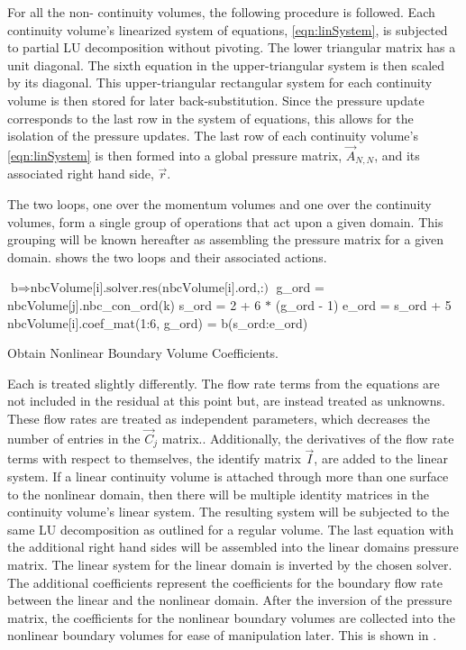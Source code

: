 For all the non- continuity volumes, the following procedure is followed.
Each continuity volume's linearized system of equations, \eqref{eqn:linSystem}, is subjected to partial LU decomposition without pivoting.
The lower triangular matrix has a unit diagonal.
The sixth equation in the upper-triangular system is then scaled by its diagonal.
This upper-triangular rectangular system for each continuity volume is then stored for later back-substitution.
Since the pressure update corresponds to the last row in the system of equations, this allows for the isolation of the pressure updates.
The last row of each continuity volume's \eqref{eqn:linSystem} is then formed into a global pressure matrix, $\vec{A}_{N,N}$, and its associated right hand side, $\vec{r}$.

The two loops, one over the momentum volumes and one over the continuity volumes, form a single group of operations that act upon a given domain.
This grouping will be known hereafter as assembling the pressure matrix for a given domain.
 shows the two loops and their associated actions.

\begin{algo}[ht!]
\setlength{\baselineskip}{0.625\baselineskip}
\begin{algorithmic}[1]
	\Set $\text{b} \Rightarrow \text{nbcVolume[i].solver.res(nbcVolume[i].ord,:)}$
			\Set g\_ord = nbcVolume[j].nbc\_con\_ord(k)
			\Set s\_ord = 2 + 6 $*$ (g\_ord - 1)
			\Set e\_ord = s\_ord + 5
			\Set nbcVolume[i].coef\_mat(1:6, g\_ord) = b(s\_ord:e\_ord)
		\EndFor
	\EndFor
\EndFor
\end{algorithmic}
\caption{Obtain Nonlinear Boundary Volume Coefficients.}
\label{alg:domDecompGetCoef}
\end{algo}

Each  is treated slightly differently.
The flow rate terms from the equations are not included in the residual at this point but, are instead treated as unknowns.
These flow rates are treated as independent parameters, which decreases the number of entries in the $\vec{C}_{j}$ matrix..
Additionally, the derivatives of the flow rate terms with respect to themselves, the identify matrix $\vec{I}$, are added to the linear system.
If a linear continuity volume is attached through more than one surface to the nonlinear domain, then there will be multiple identity matrices in the continuity volume's linear system.
The resulting system will be subjected to the same LU decomposition as outlined for a regular volume.
The last equation with the additional right hand sides will be assembled into the linear domains pressure matrix.
The linear system for the linear domain is inverted by the chosen solver.
The additional coefficients represent the coefficients for the boundary flow rate between the linear and the nonlinear domain.
After the inversion of the pressure matrix, the coefficients for the nonlinear boundary volumes are collected into the nonlinear boundary volumes for ease of manipulation later.
This is shown in .

